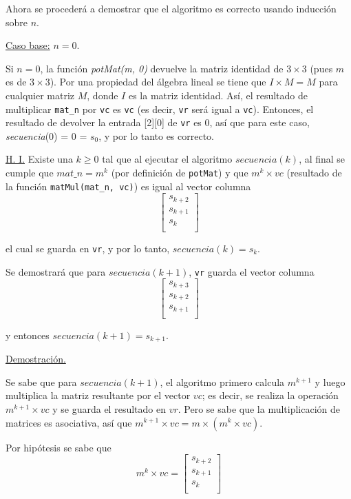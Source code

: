 \documentclass{article}
\begin{document}
Ahora se procederá a demostrar que el algoritmo es correcto usando inducción sobre $n$.

\underline{Caso base:} $n=0$.

Si $n=0$, la función \textit{potMat(m, 0)} devuelve la matriz identidad de $3 \times 3$ (pues $m$ es de $3 \times 3$). Por una propiedad del álgebra lineal se tiene que $I \times M = M$ para cualquier matriz $M$, donde $I$ es la matriz identidad. Así, el resultado de multiplicar \texttt{mat\_n} por \texttt{vc} es \texttt{vc} (es decir, \texttt{vr} será igual a \texttt{vc}). Entonces, el resultado de devolver la entrada [2][0] de \texttt{vr} es 0, así que para este caso, \textit{secuencia}(0) = 0 = $s_0$, y por lo tanto es correcto.

\underline{H. I.} Existe una $k \geq 0$ tal que al ejecutar el algoritmo $secuencia(k)$, al final se cumple que $mat\_n = m^k$ (por definición de \texttt{potMat}) y que $m^k \times vc$ (resultado de la función \texttt{matMul(mat\_n, vc)}) es igual al vector columna
\[
\begin{bmatrix}
s_{k+2} \\
s_{k+1} \\
s_k \\
\end{bmatrix}
\]

el cual se guarda en \texttt{vr}, y por lo tanto, $secuencia(k) = s_k$.

Se demostrará que para $secuencia(k+1)$, \texttt{vr} guarda el vector columna
\[
\begin{bmatrix}
s_{k+3} \\
s_{k+2} \\
s_{k+1} \\
\end{bmatrix}
\]

y entonces $secuencia(k+1) = s_{k+1}$.

\underline{Demostración.}

Se sabe que para $secuencia(k+1)$, el algoritmo primero calcula $m^{k+1}$ y luego multiplica la matriz resultante por el vector $vc$; es decir, se realiza la operación $m^{k+1} \times vc$ y se guarda el resultado en $vr$. Pero se sabe que la multiplicación de matrices es asociativa, así que $m^{k+1} \times vc = m \times (m^k \times vc)$.

Por hipótesis se sabe que
\[
m^k \times vc =
\begin{bmatrix}
s_{k+2} \\
s_{k+1} \\
s_k \\
\end{bmatrix}
\]
\end{document}

